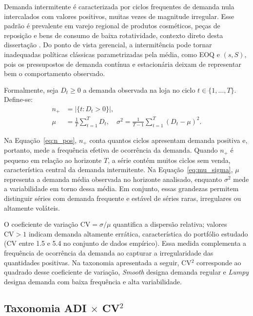 Demanda intermitente é caracterizada por ciclos frequentes de demanda nula intercalados com valores positivos, muitas vezes de magnitude irregular. Esse padrão é prevalente em varejo regional de produtos cosméticos, peças de reposição e bens de consumo de baixa rotatividade, contexto direto desta dissertação \citep{Croston1972ForecastingIntermittentDemand,Boylan2008Intermittent}. Do ponto de vista gerencial, a intermitência pode tornar inadequadas políticas clássicas parametrizadas pela média, como EOQ e $(s,S)$, pois os pressupostos de demanda contínua e estacionária deixam de representar bem o comportamento observado.

Formalmente, seja $D_t \geq 0$ a demanda observada na loja no ciclo $t \in \{1,\ldots,T\}$. Define-se:
\begin{align}
  n_{+} &= |\{t : D_t > 0\}|, \label{eq:n_pos} \\
  \mu &= \frac{1}{T}\sum_{t=1}^{T} D_t, \quad \sigma^2 = \frac{1}{T-1}\sum_{t=1}^{T}(D_t - \mu)^2. \label{eq:mu_sigma}
\end{align}

Na Equação~\ref{eq:n_pos}, $n_{+}$ conta quantos ciclos apresentam demanda positiva e, portanto, mede a frequência efetiva de ocorrência da demanda. Quando $n_{+}$ é pequeno em relação ao horizonte $T$, a série contém muitos ciclos sem venda, característica central da demanda intermitente. Na Equação~\ref{eq:mu_sigma}, $\mu$ representa a demanda média observada no horizonte analisado, enquanto $\sigma^2$ mede a variabilidade em torno dessa média. Em conjunto, essas grandezas permitem distinguir séries com demanda frequente e estável de séries raras, irregulares ou altamente voláteis.

O coeficiente de variação $\text{CV} = \sigma/\mu$ quantifica a dispersão relativa; valores $\text{CV} > 1$ indicam demanda altamente errática, característica do portfólio estudado (CV entre 1.5 e 5.4 no conjunto de dados empírico). Essa medida complementa a frequência de ocorrência da demanda ao capturar a irregularidade das quantidades positivas. Na taxonomia apresentada a seguir, CV$^2$ corresponde ao quadrado desse coeficiente de variação, \textit{Smooth} designa demanda regular e \textit{Lumpy} designa demanda com baixa frequência e alta variabilidade.

\subsection[\texorpdfstring{Taxonomia ADI $\times$ CV$^2$}{Taxonomia ADI x CV²}]{\texorpdfstring{Taxonomia ADI $\times$ CV$^2$}{Taxonomia ADI x CV²}}
\label{sec:sb_taxa}


